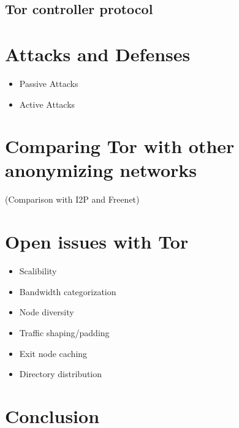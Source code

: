 \documentclass{llncs}
\begin{document}
\subsection{Tor controller protocol}

\section{Attacks and Defenses} \label{tor_attack_defence}
\begin{itemize}
	\item{Passive Attacks}
	
	\item{Active Attacks}
\end{itemize}

\section{Comparing Tor with other anonymizing networks} \label{comparison}
(Comparison with I2P and Freenet)

\section{Open issues with Tor} \label{openissues}
\begin{itemize}
	\item{Scalibility}
	\item{Bandwidth categorization}
	\item{Node diversity}
	\item{Traffic shaping/padding}
	\item{Exit node caching}
	\item{Directory distribution}
\end{itemize}

\section{Conclusion} \label{conclusion}



\end{document}

